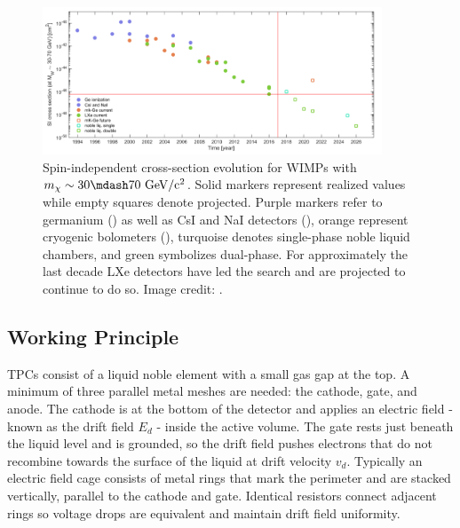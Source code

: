 \begin{figure}
\centering
\includegraphics[width=0.9\textwidth]{SensitivityEvolutionBetter}
\caption{Spin-independent cross-section evolution for WIMPs with $m_{\chi} \sim 30 \mdash 70\ \mathrm{GeV/c^2}$.  Solid markers represent
realized
values while empty squares denote projected.  Purple markers refer to germanium () as well as CsI and NaI
detectors (), orange represent cryogenic bolometers (), turquoise denotes single-phase
noble liquid chambers, and green symbolizes dual-phase.  For approximately the last decade LXe detectors have led the search and are
projected to continue to do so.  Image credit: .}
\label{fig:sensitivity_evo}
\end{figure}

\subsection{Working Principle}
\label{subsec:tpcs_working_principle}
TPCs consist of a liquid noble element with a small gas gap at the top.  A minimum of three parallel metal meshes are needed: the
cathode, gate, and anode.  The cathode is
at the bottom of the detector and applies an electric field - known as the drift field $E_d$ - inside the active volume.  The gate rests
just beneath the liquid level and is grounded, so the drift field pushes electrons that do not recombine towards the surface of the liquid
at drift velocity $v_{d}$.  Typically an electric field cage consists
of metal rings that mark the perimeter and are stacked vertically, parallel to the cathode and gate.  Identical resistors connect adjacent
rings so voltage drops are equivalent and maintain drift field uniformity.

